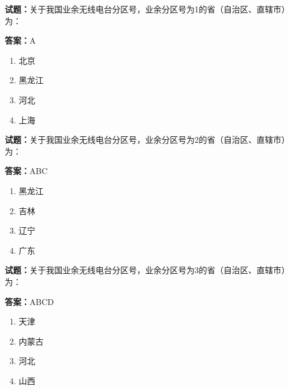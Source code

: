 \documentclass{ctexbook}
\begin{document}




\vspace{1em}

\textbf{试题：}关于我国业余无线电台分区号，业余分区号为1的省（自治区、直辖市）为： 

\textbf{答案：}A 

\begin{enumerate}[leftmargin=3em]
  \item 北京 

  \item 黑龙江 

  \item 河北 

  \item 上海 

\end{enumerate}





\vspace{1em}

\textbf{试题：}关于我国业余无线电台分区号，业余分区号为2的省（自治区、直辖市）为： 

\textbf{答案：}ABC 

\begin{enumerate}[leftmargin=3em]
  \item 黑龙江 

  \item 吉林 

  \item 辽宁 

  \item 广东 

\end{enumerate}





\vspace{1em}

\textbf{试题：}关于我国业余无线电台分区号，业余分区号为3的省（自治区、直辖市）为： 

\textbf{答案：}ABCD 

\begin{enumerate}[leftmargin=3em]
  \item 天津 

  \item 内蒙古 

  \item 河北 

  \item 山西 

\end{enumerate}
\end{document}
